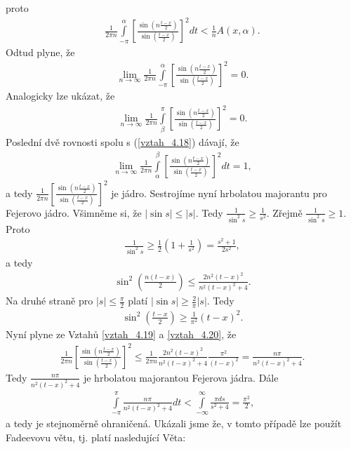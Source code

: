 proto
\begin{align*}
\frac{1}{2 \pi n} \int \limits_{-\pi}^\alpha \left[ \frac{\sin \left( n \frac{t-x}{2} \right)}{\sin \left( \frac{t-x}{2} \right)} \right]^2 dt < \frac{1}{n} A(x, \alpha).
\end{align*}
Odtud plyne, že
\begin{align*}
\lim_{n \rightarrow \infty} \frac{1}{2 \pi n} \int \limits_{-\pi}^\alpha \left[ \frac{\sin \left( n \frac{t-x}{2} \right)}{\sin \left( \frac{t-x}{2} \right)} \right]^2 = 0.
\end{align*}
Analogicky lze ukázat, že
\begin{align*}
\lim_{n \rightarrow \infty} \frac{1}{2 \pi n} \int \limits_\beta^\pi \left[ \frac{\sin \left( n \frac{t-x}{2} \right)}{\sin \left( \frac{t-x}{2} \right)} \right]^2 = 0.
\end{align*}
Poslední dvě rovnosti spolu s (\eqref{vztah_4.18}) dávají, že
\begin{align*}
\lim_{n \rightarrow \infty} \frac{1}{2 \pi n} \int \limits_\alpha^\beta \left[ \frac{\sin \left( n \frac{t-x}{2} \right)}{\sin \left( \frac{t-x}{2} \right)} \right]^2 dt = 1,
\end{align*}
a tedy $\frac{1}{2 \pi n} \left[ \frac{\sin \left( n \frac{t-x}{2} \right)}{\sin \left( \frac{t-x}{2} \right)} \right]^2$ je jádro. Sestrojíme nyní hrbolatou majorantu pro Fejerovo jádro. Všimněme si, že $|\sin s| \leq |s|$. Tedy $\frac{1}{\sin^2 s} \geq \frac{1}{s^2}$. Zřejmě $\frac{1}{\sin^2 s} \geq 1$. Proto
\begin{align*}
\frac{1}{\sin^2 s} \geq \frac{1}{2} \left( 1 + \frac{1}{s^2} \right) = \frac{s^2 + 1}{2s^2},
\end{align*}
a tedy
\begin{align}\label{vztah_4.19}
\sin^2 \left( \frac{n(t-x)}{2} \right) \leq \frac{2n^2 (t-x)^2}{n^2 (t-x)^2 + 4}.
\end{align}
Na druhé straně pro $|s| \leq \frac{\pi}{2}$ platí $|\sin s| \geq \frac{2}{\pi} |s|$. Tedy
\begin{align}\label{vztah_4.20}
\sin^2 \left( \frac{t-x}{2} \right) \geq \frac{1}{\pi^2} (t - x)^2.
\end{align}
Nyní plyne ze Vztah\r u \eqref{vztah_4.19} a \eqref{vztah_4.20}, že
\begin{align*}
\frac{1}{2 \pi n} \left[ \frac{\sin \left( n \frac{t-x}{2} \right)}{\sin \left( \frac{t-x}{2} \right)} \right]^2 \leq \frac{1}{2 \pi n} \frac{2n^2 (t-x)^2}{n^2 (t-x)^2 + 4} \frac{\pi^2}{(t-x)^2} = \frac{n \pi}{n^2 (t-x)^2 + 4}.
\end{align*}
Tedy $\frac{n \pi}{n^2 (t-x)^2 + 4}$ je hrbolatou majorantou Fejerova jádra. Dále
\begin{align*}
\int \limits_{-\pi}^\pi \frac{n \pi}{n^2 (t-x)^2 + 4} dt < \int \limits_{-\infty}^{\infty} \frac{\pi ds}{s^2 + 4} = \frac{\pi^2}{2},
\end{align*}
a tedy je stejnoměrně ohraničená. Ukázali jsme že, v tomto případě lze použít Fadeevovu  větu, tj. platí nasledující Věta:

